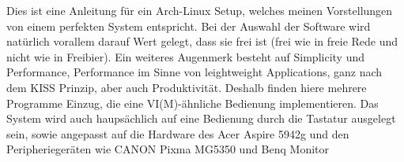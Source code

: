 Dies ist eine Anleitung für ein Arch-Linux Setup,
welches meinen Vorstellungen von einem perfekten System entspricht.
Bei der Auswahl der Software wird natürlich vorallem darauf Wert gelegt,
dass sie frei ist (frei wie in freie Rede und nicht wie in Freibier). 
Ein weiteres Augenmerk besteht auf Simplicity und Performance,
Performance im Sinne von leightweight Applications,
ganz nach dem KISS Prinzip, aber auch Produktivität.
Deshalb finden hiere mehrere Programme Einzug,
die eine VI(M)-ähnliche Bedienung implementieren.
Das System wird auch haupsächlich auf eine Bedienung durch die Tastatur ausgelegt sein,
sowie angepasst auf die Hardware des Acer Aspire 5942g und den Peripheriegeräten wie 
CANON Pixma MG5350 und Benq Monitor
